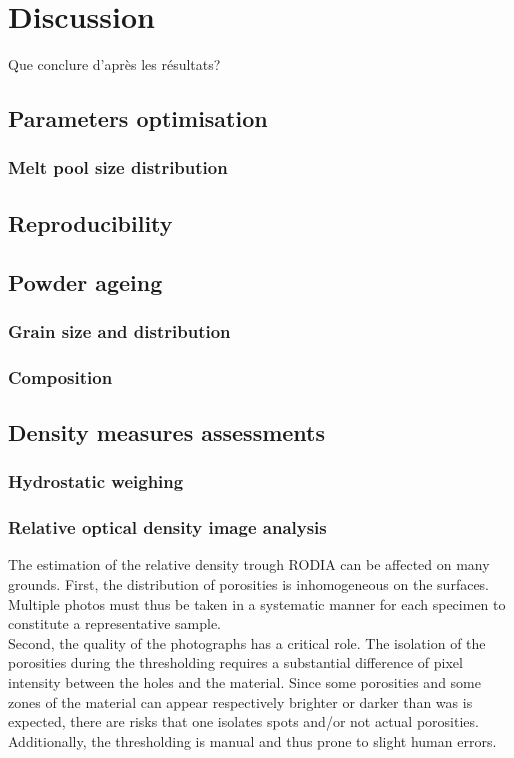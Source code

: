 \chapter{Discussion}
\label{Chap5}
Que conclure d'après les résultats?

\section{Parameters optimisation}


\subsection{Melt pool size distribution}

\section{Reproducibility}

\section{Powder ageing}
\subsection{Grain size and distribution}
\subsection{Composition}

\section{Density measures assessments}
\subsection{Hydrostatic weighing}

\subsection{Relative optical density image analysis}
The estimation of the relative density trough RODIA can be affected on many grounds. First, the distribution of porosities is inhomogeneous on the surfaces. Multiple photos must thus be taken in a systematic manner for each specimen to constitute a representative sample.\\

Second, the quality of the photographs has a critical role. The isolation of the porosities during the thresholding requires a substantial difference of pixel intensity between the holes and the material. Since some porosities and some zones of the material can appear respectively brighter or darker than was is expected, there are risks that one isolates spots and/or not actual porosities. Additionally, the thresholding is manual and thus prone to slight human errors. \\

